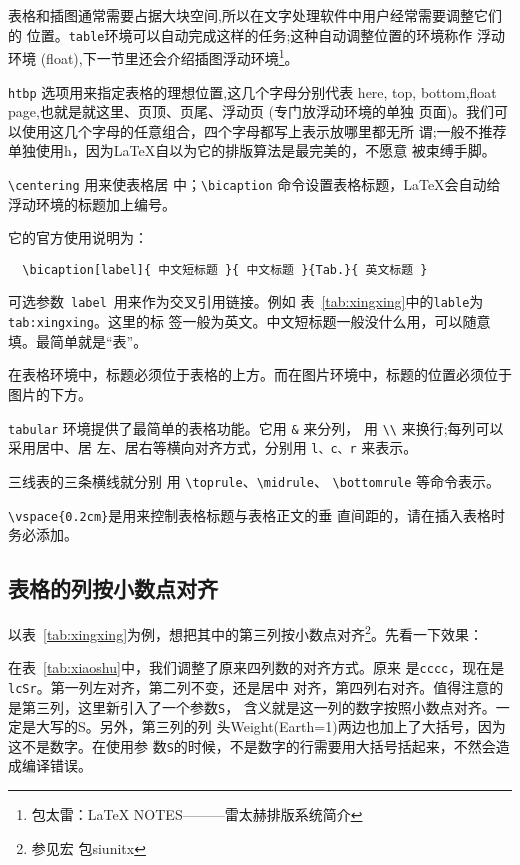 表格和插图通常需要占据大块空间,所以在文字处理软件中用户经常需要调整它们的
位置。\texttt{table}环境可以自动完成这样的任务;这种自动调整位置的环境称作
浮动环境 (float),下一节里还会介绍插图浮动环境\footnote{包太雷：\LaTeX{}
  NOTES———雷太赫排版系统简介}。

\texttt{htbp} 选项用来指定表格的理想位置,这几个字母分别代表 here, top,
bottom,float page,也就是就这里、页顶、页尾、浮动页 (专门放浮动环境的单独
页面)。我们可以使用这几个字母的任意组合，四个字母都写上表示放哪里都无所
谓;一般不推荐单独使用h，因为\LaTeX{}自以为它的排版算法是最完美的，不愿意
被束缚手脚。

\texttt{\textbackslash{centering}} 用来使表格居
中；\texttt{\textbackslash{bicaption}} 命令设置表格标题，\LaTeX{}会自动给
浮动环境的标题加上编号。

它的官方使用说明为：
\begin{lstlisting}
  \bicaption[label]{ 中文短标题 }{ 中文标题 }{Tab.}{ 英文标题 }
\end{lstlisting}
可选参数~\texttt{\footnotesize label}~用来作为交叉引用链接。例如
表~\ref{tab:xingxing}中的\texttt{lable}为\texttt{tab:xingxing}。这里的标
签一般为英文。中文短标题一般没什么用，可以随意填。最简单就是“表”。

在表格环境中，标题必须位于表格的上方。而在图片环境中，标题的位置必须位于
图片的下方。

\texttt{tabular} 环境提供了最简单的表格功能。它用 \texttt{\&} 来分列，
用 \texttt{\textbackslash{\textbackslash{}}} 来换行;每列可以采用居中、居
左、居右等横向对齐方式，分别用 \texttt{l、c、r} 来表示。

三线表的三条横线就分别
用 \texttt{\textbackslash{toprule}}、\texttt{\textbackslash{midrule}}、
\texttt{\textbackslash{bottomrule}} 等命令表示。

\texttt{\textbackslash{vspace}\{0.2cm\}}是用来控制表格标题与表格正文的垂
直间距的，请在插入表格时务必添加。


\subsection{表格的列按小数点对齐}

以表~\ref{tab:xingxing}为例，想把其中的第三列按小数点对齐\footnote{参见宏
  包siunitx}。先看一下效果：

在表~\ref{tab:xiaoshu}中，我们调整了原来四列数的对齐方式。原来
是\texttt{cccc}，现在是\texttt{lcSr}。第一列左对齐，第二列不变，还是居中
对齐，第四列右对齐。值得注意的是第三列，这里新引入了一个参数\texttt{S}，
含义就是这一列的数字按照小数点对齐。一定是大写的S。另外，第三列的列
头Weight(Earth=1)两边也加上了大括号，因为这不是数字。在使用参
数\texttt{S}的时候，不是数字的行需要用大括号括起来，不然会造成编译错误。

